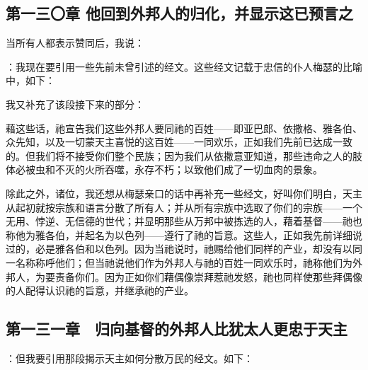 \subsection{第一三〇章 他回到外邦人的归化，并显示这已预言之}

当所有人都表示赞同后，我说：\par

：我现在要引用一些先前未曾引述的经文。这些经文记载于忠信的仆人梅瑟的比喻中，如下：\par

我又补充了该段接下来的部分：\par

藉这些话，祂宣告我们这些外邦人要同祂的百姓——即亚巴郎、依撒格、雅各伯、众先知，以及一切蒙天主喜悦的这百姓——一同欢乐，正如我们先前已达成一致的。但我们将不接受你们整个民族；因为我们从依撒意亚知道，那些违命之人的肢体必被虫和不灭的火所吞噬，永存不朽；以致他们成了一切血肉的景象。\par

除此之外，诸位，我还想从梅瑟亲口的话中再补充一些经文，好叫你们明白，天主从起初就按宗族和语言分散了所有人；并从所有宗族中选取了你们的宗族——一个无用、悖逆、无信德的世代；并显明那些从万邦中被拣选的人，藉着基督——祂也称他为雅各伯，并起名为以色列——遵行了祂的旨意。这些人，正如我先前详细说过的，必是雅各伯和以色列。因为当祂说时，祂赐给他们同样的产业，却没有以同一名称称呼他们；但当祂说他们作为外邦人与祂的百姓一同欢乐时，祂称他们为外邦人，为要责备你们。因为正如你们藉偶像崇拜惹祂发怒，祂也同样使那些拜偶像的人配得认识祂的旨意，并继承祂的产业。\par


\subsection{第一三一章　归向基督的外邦人比犹太人更忠于天主}

：但我要引用那段揭示天主如何分散万民的经文。如下：\par

